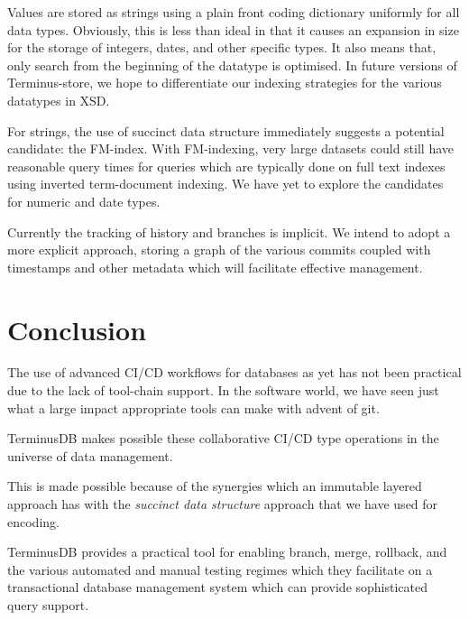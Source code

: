 \documentclass[10pt, a4paper, twocolumn]{article} %
\begin{document}
Values are stored as strings using a plain front coding dictionary
uniformly for all data types. Obviously, this is less than ideal in
that it causes an expansion in size for the storage of integers,
dates, and other specific types. It also means that, only search from
the beginning of the datatype is optimised. In future versions of
Terminus-store, we hope to differentiate our indexing strategies for
the various datatypes in XSD.

For strings, the use of succinct data structure immediately suggests a
potential candidate: the
FM-index\autocite{Ferragina:2005:ICT:1082036.1082039}. With FM-indexing,
very large datasets could still have reasonable query times for
queries which are typically done on full text indexes using inverted
term-document indexing. We have yet to explore the candidates for
numeric and date types.

Currently the tracking of history and branches is implicit. We intend
to adopt a more explicit approach, storing a graph of the various
commits coupled with timestamps and other metadata which will
facilitate effective management.

\section{Conclusion}

The use of advanced CI/CD workflows for databases as yet has not been
practical due to the lack of tool-chain support. In the software world,
we have seen just what a large impact appropriate tools can make with
advent of git.

TerminusDB makes possible these collaborative CI/CD type operations in
the universe of data management.

This is made possible because of the synergies which an immutable
layered approach has with the {\em succinct data structure} approach
that we have used for encoding.

TerminusDB provides a practical tool for enabling branch, merge,
rollback, and the various automated and manual testing regimes which
they facilitate on a transactional database management system which
can provide sophisticated query support.

\printbibliography[title={Bibliography}]
\end{document}
